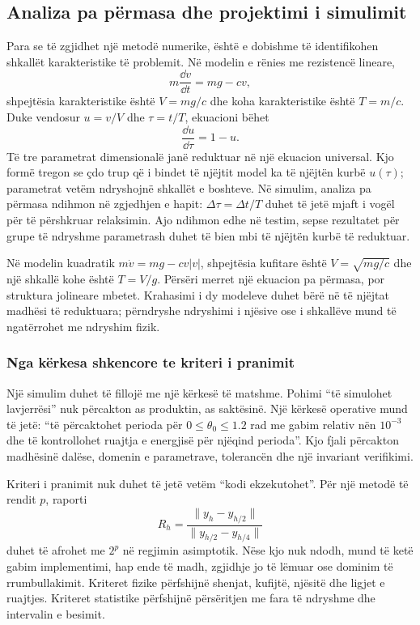\subsection{Analiza pa përmasa dhe projektimi i simulimit}
Para se të zgjidhet një metodë numerike, është e dobishme të identifikohen shkallët karakteristike të problemit. Në modelin e rënies me rezistencë lineare,
\begin{equation}
 m\frac{\dd v}{\dd t}=mg-cv,
\end{equation}
shpejtësia karakteristike është $V=mg/c$ dhe koha karakteristike është $T=m/c$. Duke vendosur $u=v/V$ dhe $\tau=t/T$, ekuacioni bëhet
\begin{equation}
 \frac{\dd u}{\dd\tau}=1-u.
\end{equation}
Të tre parametrat dimensionalë janë reduktuar në një ekuacion universal. Kjo formë tregon se çdo trup që i bindet të njëjtit model ka të njëjtën kurbë $u(\tau)$; parametrat vetëm ndryshojnë shkallët e boshteve. Në simulim, analiza pa përmasa ndihmon në zgjedhjen e hapit: $\Delta\tau=\Delta t/T$ duhet të jetë mjaft i vogël për të përshkruar relaksimin. Ajo ndihmon edhe në testim, sepse rezultatet për grupe të ndryshme parametrash duhet të bien mbi të njëjtën kurbë të reduktuar.

Në modelin kuadratik $m\dot v=mg-cv|v|$, shpejtësia kufitare është $V=\sqrt{mg/c}$ dhe një shkallë kohe është $T=V/g$. Përsëri merret një ekuacion pa përmasa, por struktura jolineare mbetet. Krahasimi i dy modeleve duhet bërë në të njëjtat madhësi të reduktuara; përndryshe ndryshimi i njësive ose i shkallëve mund të ngatërrohet me ndryshim fizik.

\subsubsection{Nga kërkesa shkencore te kriteri i pranimit}
Një simulim duhet të fillojë me një kërkesë të matshme. Pohimi ``të simulohet lavjerrësi'' nuk përcakton as produktin, as saktësinë. Një kërkesë operative mund të jetë: ``të përcaktohet perioda për $0\le\theta_0\le1.2$ rad me gabim relativ nën $10^{-3}$ dhe të kontrollohet ruajtja e energjisë për njëqind perioda''. Kjo fjali përcakton madhësinë dalëse, domenin e parametrave, tolerancën dhe një invariant verifikimi.

Kriteri i pranimit nuk duhet të jetë vetëm ``kodi ekzekutohet''. Për një metodë të rendit $p$, raporti
\begin{equation}
 R_h=\frac{\|y_h-y_{h/2}\|}{\|y_{h/2}-y_{h/4}\|}
\end{equation}
duhet të afrohet me $2^p$ në regjimin asimptotik. Nëse kjo nuk ndodh, mund të ketë gabim implementimi, hap ende të madh, zgjidhje jo të lëmuar ose dominim të rrumbullakimit. Kriteret fizike përfshijnë shenjat, kufijtë, njësitë dhe ligjet e ruajtjes. Kriteret statistike përfshijnë përsëritjen me fara të ndryshme dhe intervalin e besimit.


